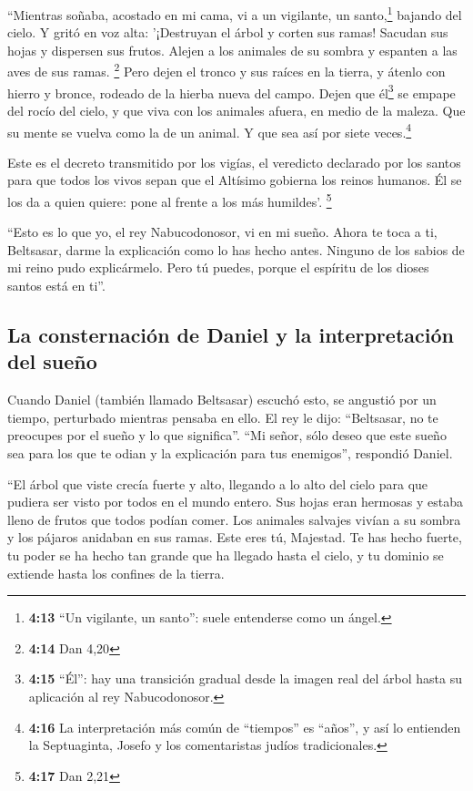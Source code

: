  ``Mientras soñaba, acostado en mi cama, vi a un
vigilante, un santo,\footnote{\textbf{4:13} ``Un vigilante, un santo'':
  suele entenderse como un ángel.} bajando del cielo.  Y
gritó en voz alta: '¡Destruyan el árbol y corten sus ramas! Sacudan sus
hojas y dispersen sus frutos. Alejen a los animales de su sombra y
espanten a las aves de sus ramas. \footnote{\textbf{4:14} Dan 4,20}
 Pero dejen el tronco y sus raíces en la tierra, y átenlo
con hierro y bronce, rodeado de la hierba nueva del campo. Dejen que
él\footnote{\textbf{4:15} ``Él'': hay una transición gradual desde la
  imagen real del árbol hasta su aplicación al rey Nabucodonosor.} se
empape del rocío del cielo, y que viva con los animales afuera, en medio
de la maleza.  Que su mente se vuelva como la de un
animal. Y que sea así por siete veces.\footnote{\textbf{4:16} La
  interpretación más común de ``tiempos'' es ``años'', y así lo
  entienden la Septuaginta, Josefo y los comentaristas judíos
  tradicionales.}

 Este es el decreto transmitido por los vigías, el
veredicto declarado por los santos para que todos los vivos sepan que el
Altísimo gobierna los reinos humanos. Él se los da a quien quiere: pone
al frente a los más humildes'. \footnote{\textbf{4:17} Dan 2,21}

 ``Esto es lo que yo, el rey Nabucodonosor, vi en mi
sueño. Ahora te toca a ti, Beltsasar, darme la explicación como lo has
hecho antes. Ninguno de los sabios de mi reino pudo explicármelo. Pero
tú puedes, porque el espíritu de los dioses santos está en ti''.

\hypertarget{la-consternaciuxf3n-de-daniel-y-la-interpretaciuxf3n-del-sueuxf1o}{%
\subsection{La consternación de Daniel y la interpretación del
sueño}\label{la-consternaciuxf3n-de-daniel-y-la-interpretaciuxf3n-del-sueuxf1o}}

 Cuando Daniel (también llamado Beltsasar) escuchó esto,
se angustió por un tiempo, perturbado mientras pensaba en ello. El rey
le dijo: ``Beltsasar, no te preocupes por el sueño y lo que significa''.
``Mi señor, sólo deseo que este sueño sea para los que te odian y la
explicación para tus enemigos'', respondió Daniel.

 ``El árbol que viste crecía fuerte y alto, llegando a lo
alto del cielo para que pudiera ser visto por todos en el mundo entero.
 Sus hojas eran hermosas y estaba lleno de frutos que
todos podían comer. Los animales salvajes vivían a su sombra y los
pájaros anidaban en sus ramas.  Este eres tú, Majestad.
Te has hecho fuerte, tu poder se ha hecho tan grande que ha llegado
hasta el cielo, y tu dominio se extiende hasta los confines de la
tierra.

